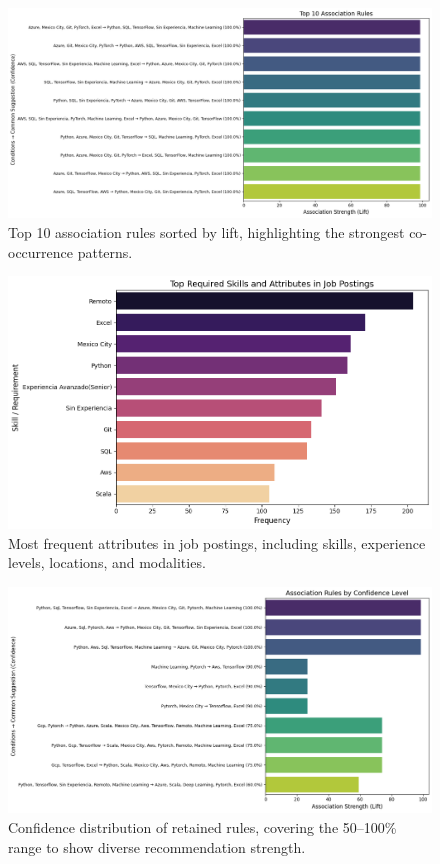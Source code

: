 \documentclass[runningheads]{llncs}
\begin{document}
	\begin{figure}[H]
		\centering
		\includegraphics[width=0.835\linewidth]{imagenes/top_rules.png}
		\caption{Top 10 association rules sorted by lift, highlighting the strongest co-occurrence patterns.}
		\label{fig:top_rules}
	\end{figure}
	
	\begin{figure}[H]
		\centering
		\includegraphics[width=0.9\linewidth]{imagenes/frequent_attributes.png}
		\caption{Most frequent attributes in job postings, including skills, experience levels, locations, and modalities.}
		\label{fig:frequent_attrs}
	\end{figure}
	
	\begin{figure}[H]
		\centering
		\includegraphics[width=0.9\linewidth]{imagenes/confidence_distribution.png}
		\caption{Confidence distribution of retained rules, covering the 50–100\% range to show diverse recommendation strength.}
		\label{fig:confidence_distribution}
	\end{figure}
	
\end{document}
